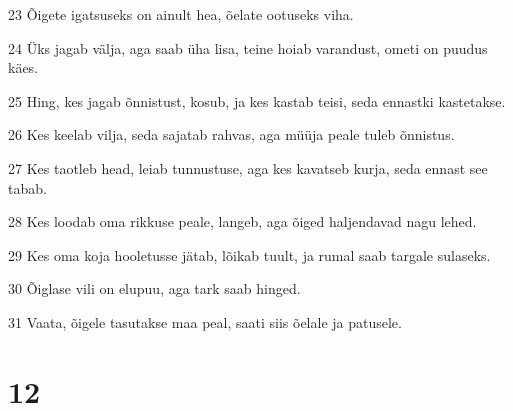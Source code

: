 \par 23 Õigete igatsuseks on ainult hea, õelate ootuseks viha.
\par 24 Üks jagab välja, aga saab üha lisa, teine hoiab varandust, ometi on puudus käes.
\par 25 Hing, kes jagab õnnistust, kosub, ja kes kastab teisi, seda ennastki kastetakse.
\par 26 Kes keelab vilja, seda sajatab rahvas, aga müüja peale tuleb õnnistus.
\par 27 Kes taotleb head, leiab tunnustuse, aga kes kavatseb kurja, seda ennast see tabab.
\par 28 Kes loodab oma rikkuse peale, langeb, aga õiged haljendavad nagu lehed.
\par 29 Kes oma koja hooletusse jätab, lõikab tuult, ja rumal saab targale sulaseks.
\par 30 Õiglase vili on elupuu, aga tark saab hinged.
\par 31 Vaata, õigele tasutakse maa peal, saati siis õelale ja patusele.

\chapter{12}

